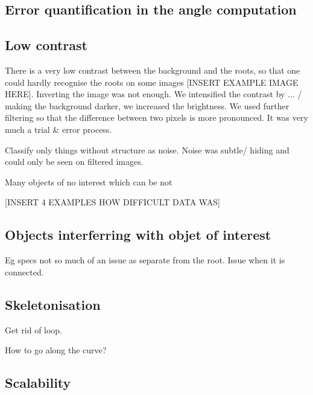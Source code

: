 \subsection{Error quantification in the angle computation}


\subsection{Low contrast}



There is a very low contrast between the background and the roots, so that one could hardly recognise the roots on some images [INSERT EXAMPLE IMAGE HERE].
Inverting the image was not enough. We intensified the contrast by ... / making the background darker, we increased the brightness. We used further filtering so that the difference between two pixels is more pronounced.
It was very much a trial \& error process.

Classify only things without structure as noise. 
Noise was subtle/ hiding and could only be seen on filtered images.

Many objects of no interest which can be not 


[INSERT 4 EXAMPLES HOW DIFFICULT DATA WAS]


\subsection{Objects interferring with objet of interest}

Eg specs not so much of an issue as separate from the root.
Issue when it is connected.


\subsection{Skeletonisation}
Get rid of loop.

How to go along the curve?


\subsection{Scalability}

